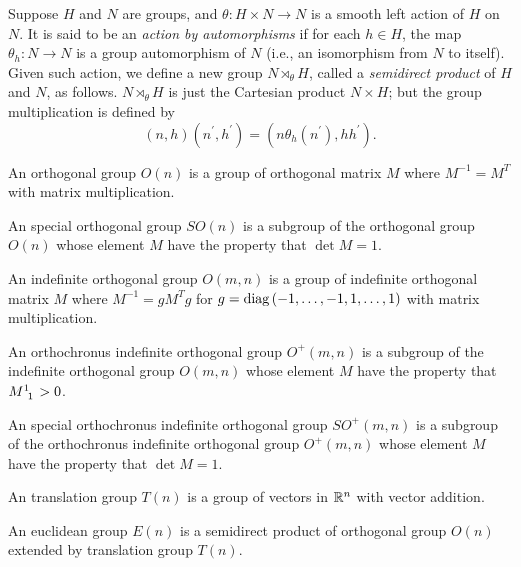 \documentclass[../main.tex]{subfiles}
\begin{document}
\begin{definition}\label{Group:SemidirectProduct}
    Suppose $H$ and $N$ are groups,
    and $\theta:H\times N\to N$ is a smooth left action of $H$ on $N$.
    It is said to be an \textit{action by automorphisms}
    if for each $h\in H$, the map $\theta_h:N\to N$ is a group automorphism of $N$ (i.e., an isomorphism from $N$ to itself).
    Given such action, we define a new group $N\rtimes_\theta H$,
    called a \textit{semidirect product} of $H$ and $N$, as follows.
    $N\rtimes_\theta H$ is just the Cartesian product $N\times H$;
    but the group multiplication is defined by
    $$\left(n,h\right)\left(n^\prime,h^\prime\right)=\left(n\theta_h\left(n^\prime\right),hh^\prime\right)\text{.}$$
\end{definition}

\begin{definition}\label{OrthogonalGroup}
    An orthogonal group $O\left(n\right)$ is a group of orthogonal matrix $M$ where $M^{-1}=M^T$ with matrix multiplication.
\end{definition}
\begin{definition}\label{SpecialOrthogonalGroup}
    An special orthogonal group $SO\left(n\right)$ is a subgroup of the orthogonal group $O\left(n\right)$ whose element $M$ have the property that $\det{M}=1$.
\end{definition}
\begin{definition}\label{IndefiniteOrthogonalGroup}
    An indefinite orthogonal group $O\left(m,n\right)$ is a group of indefinite orthogonal matrix $M$ where $M^{-1}=gM^Tg$ for $g=\operatorname{diag}{\left(-1,\dots,-1,1,\dots,1\right)}$ with matrix multiplication.
\end{definition}
\begin{definition}\label{OrthochronusIndefiniteOrthogonalGroup}
    An orthochronus indefinite orthogonal group $O^+\left(m,n\right)$ is a subgroup of the indefinite orthogonal group $O\left(m,n\right)$ whose element $M$ have the property that $\tensor{M}{^1_1}>0$.
\end{definition}
\begin{definition}\label{SpecialOrthochronusIndefiniteOrthogonalGroup}
    An special orthochronus indefinite orthogonal group $SO^+\left(m,n\right)$ is a subgroup of the orthochronus indefinite orthogonal group $O^+\left(m,n\right)$ whose element $M$ have the property that $\det{M}=1$.
\end{definition}
\begin{definition}\label{TranslationGroup}
    An translation group $T\left(n\right)$ is a group of vectors in $\mathbb{R}^n$ with vector addition.
\end{definition}
\begin{definition}\label{EuclideanGroup}
    An euclidean group $E\left(n\right)$ is a semidirect product of orthogonal group $O\left(n\right)$ extended by translation group $T\left(n\right)$.
\end{definition}
\end{document}
